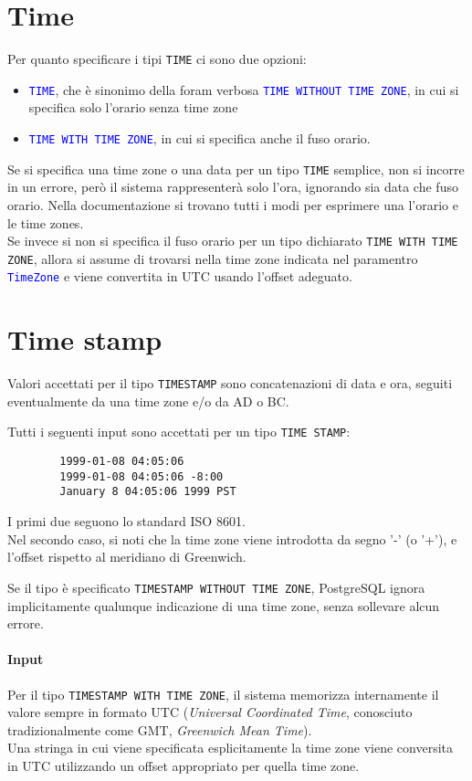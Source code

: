 \documentclass[12pt,a4paper]{book}
\begin{document}
	\section{Time} Per quanto specificare i tipi \texttt{TIME} ci sono due opzioni:
	\begin{itemize}
		\item \textcolor{blue}{\texttt{TIME}}, che è sinonimo della foram verbosa \textcolor{blue}{\texttt{TIME WITHOUT TIME ZONE}}, in cui si specifica solo l'orario senza time zone
		\item \textcolor{blue}{\texttt{TIME WITH TIME ZONE}}, in cui si specifica anche il fuso orario.
	\end{itemize}
	Se si specifica una time zone o una data per un tipo \texttt{TIME} semplice, non si incorre in un errore, però il sistema rappresenterà solo l'ora, ignorando sia data che fuso orario. Nella documentazione si trovano tutti i modi per esprimere una l'orario e le time zones.\\
	Se invece si non si specifica il fuso orario per un tipo dichiarato \texttt{TIME WITH TIME ZONE}, allora si assume di trovarsi nella time zone indicata nel paramentro \textcolor{blue}{\texttt{TimeZone}} e viene convertita in UTC usando l'offset adeguato.
	\section{Time stamp} Valori accettati per il tipo \texttt{TIMESTAMP} sono concatenazioni di data e ora, seguiti eventualmente da una time zone e/o da AD o BC.
	\begin{tcolorbox}[enhanced jigsaw, breakable, title=Esempio, title filled]
		Tutti i seguenti input sono accettati per un tipo \texttt{TIME STAMP}:
		\begin{lstlisting}
		1999-01-08 04:05:06
		1999-01-08 04:05:06 -8:00
		January 8 04:05:06 1999 PST
		\end{lstlisting}
		I primi due seguono lo standard ISO 8601.\\
		Nel secondo caso, si noti che la time zone viene introdotta da segno '-' (o '+'), e l'offset rispetto al meridiano di Greenwich.
	\end{tcolorbox}
	Se il tipo è specificato \texttt{TIMESTAMP WITHOUT TIME ZONE}, PostgreSQL ignora implicitamente qualunque indicazione di una time zone, senza sollevare alcun errore.
	\paragraph{Input} Per il tipo \texttt{TIMESTAMP WITH TIME ZONE}, il sistema memorizza internamente il valore sempre in formato UTC (\textit{Universal Coordinated Time}, conosciuto tradizionalmente come GMT, \textit{Greenwich Mean Time}).\\Una stringa in cui viene specificata esplicitamente la time zone viene conversita in UTC utilizzando un offset appropriato per quella time zone.
\end{document}
